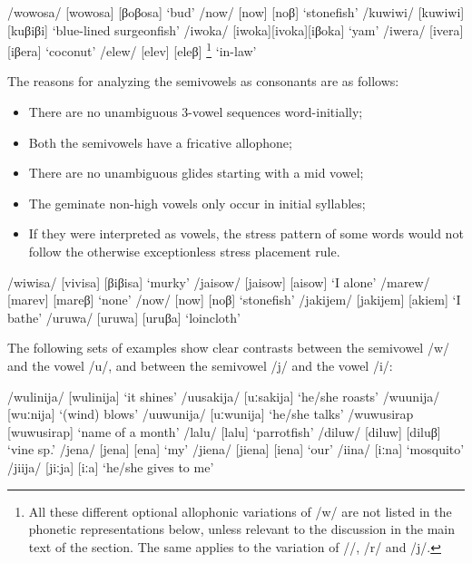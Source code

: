 \ea 
\ea
/wowosa/  [wo{{\textprimstress}wosa}] {\Tilde} [βo{{\textprimstress}βosa}]  `bud'
\ex
/now/  [now] {\Tilde} [noβ]  `stonefish'
\ex
/kuwiwi/  [ku{{\textprimstress}wiwi}] {\Tilde} [ku{{\textprimstress}βiβi}]  `blue-lined surgeonfish'
\ex
/iwoka/  [i{{\textprimstress}woka}]{\Tilde}[i{{\textprimstress}voka}]{\Tilde}[i{{\textprimstress}βoka}]  `yam'
\ex
/iwera/  [i{{\textprimstress}vera}] {\Tilde} [i{{\textprimstress}βera}]  `coconut'
\ex
/elew/  [e{{\textprimstress}lev}] {\Tilde} [e{{\textprimstress}leβ}] \footnote{All these different optional allophonic variations of /w/ are not listed in the phonetic representations below, unless relevant to the discussion in the main text of the section. The same applies to the variation of /{\textphi}/, /r/ and /j/.}  `in-law'
\z
\z


The reasons for analyzing the semivowels as consonants are as follows:


\begin{itemize}
\item There are no unambiguous 3-vowel sequences word-initially; 
\item Both the semivowels have a fricative allophone;
\item There are no unambiguous glides starting with a mid vowel; 
\item The geminate non-high vowels only occur in initial syllables;
\item If they were interpreted as vowels, the stress pattern of some words would not follow the otherwise exceptionless stress placement rule.
\end{itemize}

\ea
\ea
/wiwisa/  [vi{{\textprimstress}visa}] {\Tilde} [βi{{\textprimstress}βisa}]  `murky'
\ex
/jaisow/  [{{\textprimstress}jaisow}] {\Tilde} [{{\textprimstress}}{\textyogh}aisow]  `I alone'
\ex
/marew/  [ma{{\textprimstress}rev}] {\Tilde} [ma{{\textprimstress}}reβ]  `none'
\ex
/now/  [now] {\Tilde} [noβ]  `stonefish'
\ex
/jakijem/  [ja{{\textprimstress}kijem}] {\Tilde} [{\textyogh}a{{\textprimstress}}ki{\textyogh}em]  `I bathe'
\ex
/uruwa/  [u{{\textprimstress}ruwa}] {\Tilde} [u{{\textprimstress}}ruβa]  `loincloth'
\z
\z

The following sets of examples show clear contrasts between the semivowel /w/ and the vowel /u/, and between the semivowel /j/ and the vowel /i/:

\ea 
\ea
/wulinija/  [wu{{\textprimstress}linija}]  `it shines'
\ex
/uusakija/  [{{\textprimstress}uːsakija}]  `he/she roasts'
\ex
/wuunija/  [{{\textprimstress}wuːnija}]  `(wind) blows'
\ex
/uuwunija/  [{{\textprimstress}uːwunija}]  `he/she talks'
\ex
/wuwusirap  [wu{{\textprimstress}wusirap}]  `name of a month'
\ex
/lalu/  [la{{\textprimstress}lu}]  `parrotfish'
\ex
/diluw/  [di{{\textprimstress}luw}] {\Tilde} [di{{\textprimstress}luβ}]  `vine sp.'
\ex
/jena/  [je{{\textprimstress}na}] {\Tilde} [{\textyogh}e{{\textprimstress}na}]  `my'
\ex
/jiena/  [ji{{\textprimstress}ena}] {\Tilde} [{\textyogh}i{{\textprimstress}ena}]  `our'
\ex
/iina/  [{{\textprimstress}iːna}]  `mosquito'
\ex
/jiija/  [{{\textprimstress}jiːja}] {\Tilde} [{{\textprimstress}}{\textyogh}iː{\textyogh}a]  `he/she gives to me'
\z
\z


